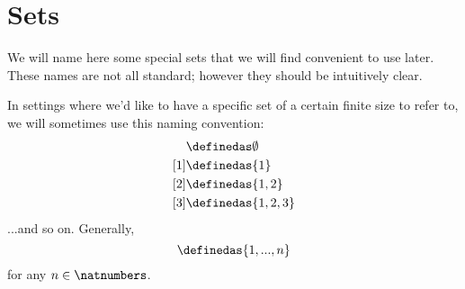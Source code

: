 \section{Sets}






We will name here some special sets that we will find convenient to use later. These names are not all standard; however they should be intuitively clear. 

In settings where we'd like to have a specific set of a certain finite size to refer to, we will sometimes use this naming convention:
\begin{align*}
[0] & \definedas \emptyset \\
[1] & \definedas \{ 1\} \\
[2] & \definedas \{ 1, 2\} \\
[3] & \definedas \{ 1, 2, 3\} 
\end{align*}
...and so on. Generally, 
\begin{equation}
[n] \definedas \{ 1, ..., n\}
\end{equation}
for any $n \in \natnumbers$. 



\clearpage
